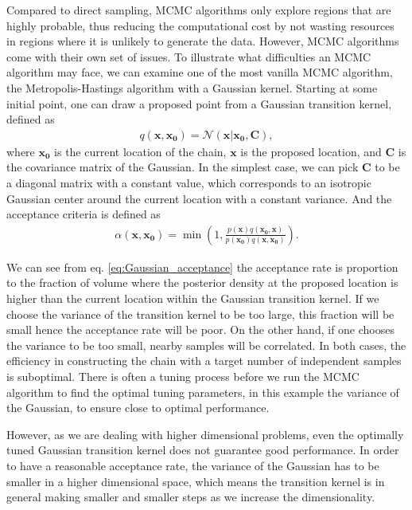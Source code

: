\documentclass[twocolumn]{aastex631}
\begin{document}
Compared to direct sampling, MCMC algorithms only explore regions that are
highly probable, thus reducing the computational cost by not wasting resources in
regions where it is unlikely to generate the data. However, MCMC algorithms come
with their own set of issues. To illustrate what difficulties an MCMC algorithm
may face, we can examine one of the most vanilla MCMC algorithm, the
Metropolis-Hastings algorithm with a Gaussian kernel. Starting at some initial
point, one can draw a proposed point from a Gaussian transition kernel, defined
as
\begin{align}
    q(\mathbf{x},\mathbf{x_0})= \mathcal{N}(\mathbf{x}|\mathbf{x_0},\mathbf{C}),
\end{align}
where $\mathbf{x_0}$ is the current location of the chain, $\mathbf{x}$ is the
proposed location, and $\mathbf{C}$ is the covariance matrix of the Gaussian. In
the simplest case, we can pick $\mathbf{C}$ to be a diagonal matrix with a
constant value, which corresponds to an isotropic Gaussian center around the
current location with a constant variance. And the acceptance criteria is
defined as
\begin{align}
\alpha(\mathbf{x},\mathbf{x_0}) = \min\left(1,\frac{p(\mathbf{x})q(\mathbf{x_0},\mathbf{x})}{p(\mathbf{x_0})q(\mathbf{x},\mathbf{x_0})}\right).
\label{eq:Gaussian_acceptance}
\end{align}

We can see from eq. \ref{eq:Gaussian_acceptance} the acceptance rate is
proportion to the fraction of volume where the posterior density at the proposed
location is higher than the current location within the Gaussian transition
kernel. If we choose the variance of the transition kernel to be too large, this
fraction will be small hence the acceptance rate will be poor. On the other
hand, if one chooses the variance to be too small, nearby samples will be
correlated. In both cases, the efficiency in constructing the chain with a
target number of independent samples is suboptimal. There is often a tuning
process before we run the MCMC algorithm to find the optimal tuning parameters,
in this example the variance of the Gaussian, to ensure close to optimal
performance.

However, as we are dealing with higher dimensional problems, even the optimally
tuned Gaussian transition kernel does not guarantee good performance. In order
to have a reasonable acceptance rate, the variance of the Gaussian has to be
smaller in a higher dimensional space, which means the transition kernel is in
general making smaller and smaller steps as we increase the dimensionality.
\end{document}
